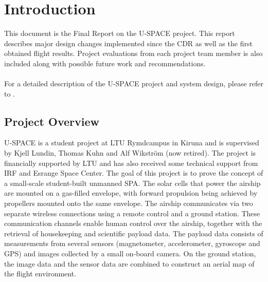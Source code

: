 \newpage
\chapter{Introduction}
\label{chap:introduction}
%
This document is the Final Report on the \ac{U-SPACE} project. This report describes major design changes implemented since the \ac{CDR}\cite{CDR} as well as the first obtained flight results. Project evaluations from each project team member is also included along with possible future work and recommendations.
\\\\
%
For a detailed description of the \ac{U-SPACE} project and system design, please refer to \cite{CDR}.
%
\section{Project Overview}
\ac{U-SPACE} is a student project at \ac{LTU} Rymdcampus in Kiruna and is supervised by Kjell Lundin, Thomas Kuhn and Alf Wikstr\"{o}m (now retired). The project is financially supported by \ac{LTU} and has also received some technical support from \ac{IRF} and Esrange Space Center. The goal of this project is to prove the concept of a small-scale student-built unmanned \ac{SPA}. The solar cells that power the airship are mounted on a gas-filled envelope, with forward propulsion being achieved by propellers mounted onto the same envelope. The airship communicates via two separate wireless connections using a remote control and a ground station. These communication channels enable human control over the airship, together with the retrieval of housekeeping and scientific payload data. The payload data consists of measurements from several sensors (magnetometer, accelerometer, gyroscope and \ac{GPS}) and images collected by a small on-board camera. On the ground station, the image data and the sensor data are combined to construct an aerial map of the flight environment.